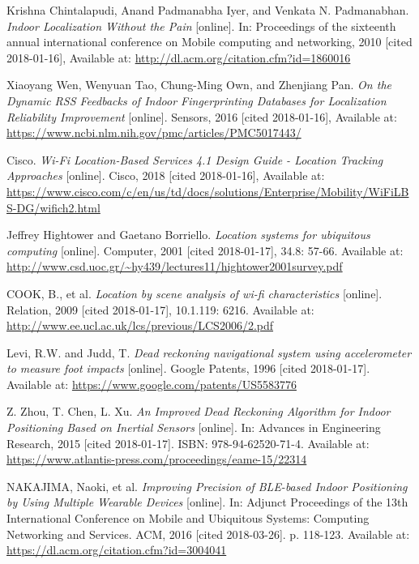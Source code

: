 \begin{thebibliography}{10}
Krishna Chintalapudi, Anand Padmanabha Iyer, and Venkata N. Padmanabhan. \textit{Indoor Localization Without the Pain} [online]. In: Proceedings of the sixteenth annual international conference on Mobile computing and networking, 2010 [cited 2018-01-16], Available at: \url{http://dl.acm.org/citation.cfm?id=1860016}

Xiaoyang Wen, Wenyuan Tao, Chung-Ming Own, and Zhenjiang Pan. \textit{On the Dynamic RSS Feedbacks of Indoor Fingerprinting Databases for Localization Reliability Improvement} [online]. Sensors, 2016 [cited 2018-01-16], Available at: \url{https://www.ncbi.nlm.nih.gov/pmc/articles/PMC5017443/}

Cisco. \textit{Wi-Fi Location-Based Services 4.1 Design Guide - Location Tracking Approaches} [online]. Cisco, 2018 [cited 2018-01-16], Available at: \url{https://www.cisco.com/c/en/us/td/docs/solutions/Enterprise/Mobility/WiFiLBS-DG/wifich2.html}

Jeffrey Hightower and Gaetano Borriello. \textit{Location systems for ubiquitous computing} [online]. Computer, 2001 [cited 2018-01-17], 34.8: 57-66. Available at: \url{http://www.csd.uoc.gr/~hy439/lectures11/hightower2001survey.pdf}

COOK, B., et al. \textit{Location by scene analysis of wi-fi characteristics} [online]. Relation, 2009 [cited 2018-01-17], 10.1.119: 6216. Available at: \url{http://www.ee.ucl.ac.uk/lcs/previous/LCS2006/2.pdf}

Levi, R.W. and Judd, T. \textit{Dead reckoning navigational system using accelerometer to measure foot impacts} [online]. Google Patents, 1996 [cited 2018-01-17]. Available at: \url{https://www.google.com/patents/US5583776}

Z. Zhou, T. Chen, L. Xu. \textit{An Improved Dead Reckoning Algorithm for Indoor Positioning Based on Inertial Sensors} [online]. In: Advances in Engineering Research, 2015 [cited 2018-01-17]. ISBN: 978-94-62520-71-4. Available at: \url{https://www.atlantis-press.com/proceedings/eame-15/22314}

NAKAJIMA, Naoki, et al. \textit{Improving Precision of BLE-based Indoor Positioning by Using Multiple Wearable Devices} [online]. In: Adjunct Proceedings of the 13th International Conference on Mobile and Ubiquitous Systems: Computing Networking and Services. ACM, 2016 [cited 2018-03-26]. p. 118-123. Available at: \url{https://dl.acm.org/citation.cfm?id=3004041}


\end{thebibliography}
